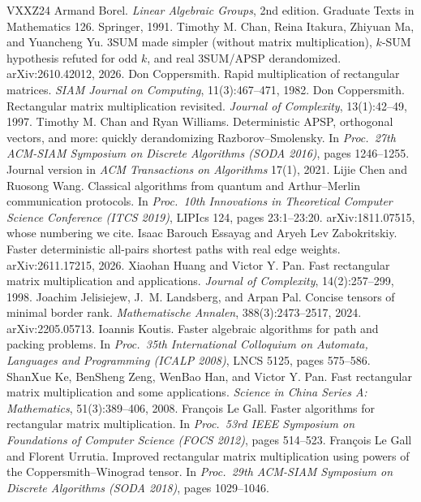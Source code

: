 \documentclass[11pt]{article}
\theoremstyle{definition}
\theoremstyle{remark}
\begin{document}
\begin{thebibliography}{VXXZ24}
 Armand Borel. \emph{Linear Algebraic Groups}, 2nd edition. Graduate Texts in Mathematics 126. Springer, 1991.
 Timothy M. Chan, Reina Itakura, Zhiyuan Ma, and Yuancheng Yu. 3SUM made simpler (without matrix multiplication), $k$-SUM hypothesis refuted for odd $k$, and real 3SUM/APSP derandomized. arXiv:2610.42012, 2026.
 Don Coppersmith. Rapid multiplication of rectangular matrices. \emph{SIAM Journal on Computing}, 11(3):467--471, 1982.
 Don Coppersmith. Rectangular matrix multiplication revisited. \emph{Journal of Complexity}, 13(1):42--49, 1997.
 Timothy M. Chan and Ryan Williams. Deterministic APSP, orthogonal vectors, and more: quickly derandomizing Razborov--Smolensky. In \emph{Proc.\ 27th ACM-SIAM Symposium on Discrete Algorithms (SODA 2016)}, pages 1246--1255. Journal version in \emph{ACM Transactions on Algorithms} 17(1), 2021.
 Lijie Chen and Ruosong Wang. Classical algorithms from quantum and Arthur--Merlin communication protocols. In \emph{Proc.\ 10th Innovations in Theoretical Computer Science Conference (ITCS 2019)}, LIPIcs 124, pages 23:1--23:20. arXiv:1811.07515, whose numbering we cite.
 Isaac Barouch Essayag and Aryeh Lev Zabokritskiy. Faster deterministic all-pairs shortest paths with real edge weights. arXiv:2611.17215, 2026.
 Xiaohan Huang and Victor Y. Pan. Fast rectangular matrix multiplication and applications. \emph{Journal of Complexity}, 14(2):257--299, 1998.
 Joachim Jelisiejew, J.~M. Landsberg, and Arpan Pal. Concise tensors of minimal border rank. \emph{Mathematische Annalen}, 388(3):2473--2517, 2024. arXiv:2205.05713.
 Ioannis Koutis. Faster algebraic algorithms for path and packing problems. In \emph{Proc.\ 35th International Colloquium on Automata, Languages and Programming (ICALP 2008)}, LNCS 5125, pages 575--586.
 ShanXue Ke, BenSheng Zeng, WenBao Han, and Victor Y. Pan. Fast rectangular matrix multiplication and some applications. \emph{Science in China Series A: Mathematics}, 51(3):389--406, 2008.
 François Le Gall. Faster algorithms for rectangular matrix multiplication. In \emph{Proc.\ 53rd IEEE Symposium on Foundations of Computer Science (FOCS 2012)}, pages 514--523.
 François Le Gall and Florent Urrutia. Improved rectangular matrix multiplication using powers of the Coppersmith--Winograd tensor. In \emph{Proc.\ 29th ACM-SIAM Symposium on Discrete Algorithms (SODA 2018)}, pages 1029--1046.

\end{thebibliography}
\end{document}
